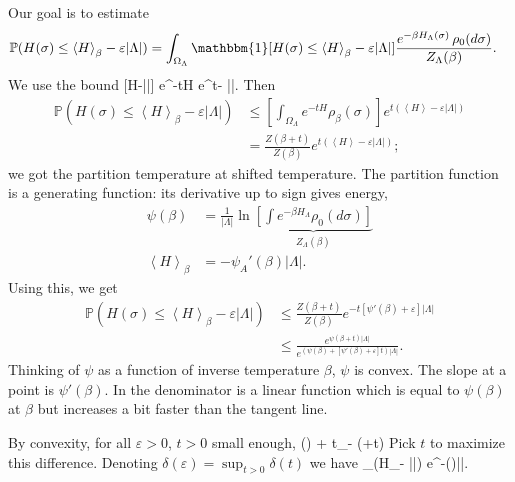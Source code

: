 Our goal is to estimate 
\begin{align*}
\mathbb{P}(H(\sigma)\le \left\langle {H}\right\rangle_\beta - \varepsilon |\Lambda|)
&=\int_{\Omega_\Lambda} \mathbbm{1}[H(\sigma)\le \left\langle {H}\right\rangle_\beta - \varepsilon |\Lambda|] \frac{e^{-\beta H_\Lambda(\sigma)}\,\rho_0(d\sigma)}{Z_{\Lambda}(\beta)}.
\end{align*}
We use the bound 
\be
{}[H\le \left{}\right\rangle-\varepsilon |\Lambda|] \le e^{-tH} e^{t\left{}\right\rangle - \varepsilon|\Lambda|}.
\ee
Then 
\begin{align*}
\mathbb{P}(H(\sigma)\le \left\langle {H}\right\rangle_\beta - \varepsilon |\Lambda|)
&\le \left[ {\int_{\Omega_\Lambda} e^{-tH}\rho_{\beta}(\sigma)} \right] e^{t(\left\langle {H}\right\rangle-\varepsilon|\Lambda|)}\\
&= \frac{Z(\beta+t)}{Z(\beta)}e^{t(\left\langle {H}\right\rangle-\varepsilon|\Lambda|)};
\end{align*}
we got the partition temperature at shifted temperature.
The partition function is a generating function: its derivative up to sign gives energy,
\begin{align*}
\psi(\beta) &= \frac{1}{|\Lambda|}\ln \underbrace{\left[ { \int e^{-\beta H_\Lambda} \rho_0(d\sigma)} \right]}_{Z_{\Lambda}(\beta)}\\
\left\langle {H}\right\rangle_\beta &= -\psi_A'(\beta) |\Lambda|.
\end{align*}
Using this, we get
\begin{align*}
\mathbb{P}(H(\sigma)\le \left\langle {H}\right\rangle_\beta - \varepsilon |\Lambda|)&\le 
\frac{Z(\beta+t)}{Z(\beta)}e^{-t[\psi'(\beta)+\varepsilon]|\Lambda|}\\
&\le \frac{e^{\psi(\beta+t)|\Lambda|}}{e^{(\psi(\beta) + [\psi'(\beta) + \varepsilon]t)|\Lambda|}}.%
\end{align*}
Thinking of $\psi$ as a function of inverse temperature $\beta$, $\psi$ is convex. The slope at a point is $\psi'(\beta)$. In the denominator is a linear function which is equal to $\psi(\beta)$ at $\beta$ but increases a bit faster than the tangent line.

By convexity, for all $\varepsilon>0$, $t>0$ small enough, %
\be
\psi(\beta) + t_ - \psi(\beta+t) 
\ee
Pick $t$ to maximize this difference. Denoting $\delta(\varepsilon)=\sup_{t>0}\delta(t)$ we have
\be
{}_\beta (H_\Lambda\le \left{}\right\rangle - \varepsilon|\Lambda|) \le e^{-\delta (\varepsilon)|\Lambda|}.
\ee

